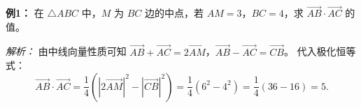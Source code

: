 \begin{examplebox}
\textbf{例1：} 在 $\triangle ABC$ 中，$M$ 为 $BC$ 边的中点，若 $AM=3$，$BC=4$，求 $\vec{AB} \cdot \vec{AC}$ 的值。

\textit{解析：} 
由中线向量性质可知 $\vec{AB} + \vec{AC} = 2\vec{AM}$，$\vec{AB} - \vec{AC} = \vec{CB}$。
代入极化恒等式：
\[ \vec{AB} \cdot \vec{AC} = \frac{1}{4} \left( |2\vec{AM}|^2 - |\vec{CB}|^2 \right) = \frac{1}{4} (6^2 - 4^2) = \frac{1}{4}(36-16) = 5. \]
\end{examplebox}